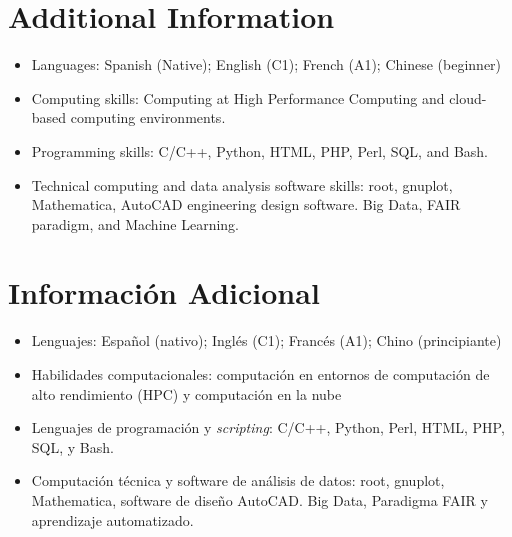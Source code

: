 \ifeng
\section*{Additional Information}

\begin{itemize}
  \item Languages: Spanish (Native); English (C1); French (A1); Chinese (beginner)
  \item Computing skills: Computing at High Performance Computing and cloud-based computing environments.
  \item Programming skills: C/C++, Python, HTML, PHP, Perl, SQL, and Bash.
  \item Technical computing and data analysis software skills: root, gnuplot, Mathematica, AutoCAD engineering design software. Big Data, FAIR paradigm, and Machine Learning.
\end{itemize}
\else
\section*{Información Adicional}

\begin{itemize}
\item Lenguajes: Español (nativo); Inglés (C1); Francés (A1); Chino (principiante)
\item Habilidades computacionales: computación en entornos de computación de alto rendimiento (HPC) y computación en la nube
\item Lenguajes de programación y {\emph{scripting}}: C/C++, Python, Perl, HTML, PHP, SQL, y Bash.
\item Computación técnica y software de análisis de datos: root, gnuplot, Mathematica, software de diseño AutoCAD. Big Data, Paradigma FAIR y aprendizaje automatizado.
\end{itemize}
\fi